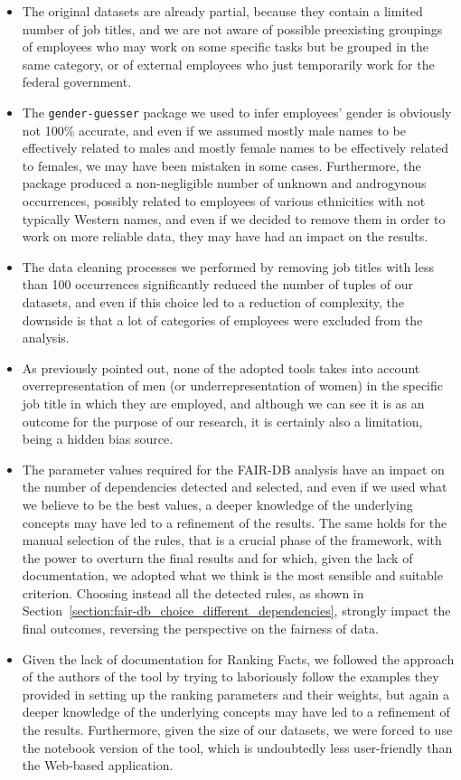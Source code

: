 \begin{itemize}
\item The original datasets are already partial, because they contain a limited number of job titles, and we are not aware of possible preexisting groupings of employees who may work on some specific tasks but be grouped in the same category, or of external employees who just temporarily work for the federal government.
\item The \texttt{gender-guesser} package we used to infer employees' gender is obviously not 100\% accurate, and even if we assumed mostly male names to be effectively related to males and mostly female names to be effectively related to females, we may have been mistaken in some cases. Furthermore, the package produced a non-negligible number of unknown and androgynous occurrences, possibly related to employees of various ethnicities with not typically Western names, and even if we decided to remove them in order to work on more reliable data, they may have had an impact on the results.
\item The data cleaning processes we performed by removing job titles with less than 100 occurrences significantly reduced the number of tuples of our datasets, and even if this choice led to a reduction of complexity, the downside is that a lot of categories of employees were excluded from the analysis.
\item As previously pointed out, none of the adopted tools takes into account overrepresentation of men (or underrepresentation of women) in the specific job title in which they are employed, and although we can see it is as an outcome for the purpose of our research, it is certainly also a limitation, being a hidden bias source.
\item The parameter values required for the FAIR-DB analysis have an impact on the number of dependencies detected and selected, and even if we used what we believe to be the best values, a deeper knowledge of the underlying concepts may have led to a refinement of the results. The same holds for the manual selection of the rules, that is a crucial phase of the framework, with the power to overturn the final results and for which, given the lack of documentation, we adopted what we think is the most sensible and suitable criterion. Choosing instead all the detected rules, as shown in Section~\ref{section:fair-db_choice_different_dependencies}, strongly impact the final outcomes, reversing the perspective on the fairness of data.
\item Given the lack of documentation for Ranking Facts, we followed the approach of the authors of the tool by trying to laboriously follow the examples they provided in setting up the ranking parameters and their weights, but again a deeper knowledge of the underlying concepts may have led to a refinement of the results. Furthermore, given the size of our datasets, we were forced to use the notebook version of the tool, which is undoubtedly less user-friendly than the Web-based application.

\end{itemize}
